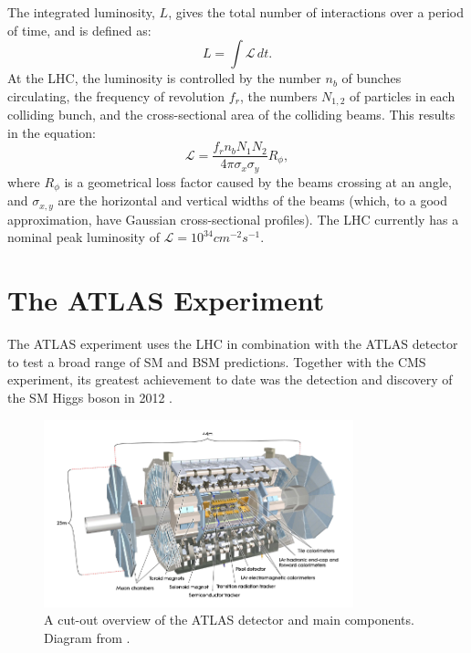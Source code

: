 The integrated luminosity, $L$, gives the total number of interactions over a period of time, and is defined as:
\begin{equation}
L = \int \mathcal{L}\, dt.
\end{equation}
At the LHC, the luminosity is controlled by the number $n_b$ of bunches circulating, the frequency of revolution $f_r$, the numbers $N_{1,2}$ of particles in each colliding bunch, and the cross-sectional area of the colliding beams. This results in the equation:
\begin{equation}
\mathcal{L}  = \frac{ f_rn_bN_1N_2 }{4\pi\sigma_x\sigma_y}R_{\phi},
\end{equation}
where $R_{\phi}$ is a geometrical loss factor caused by the beams crossing at an angle, and $\sigma_{x,y}$ are the horizontal and vertical widths of the beams (which, to a good approximation, have Gaussian cross-sectional profiles). The LHC currently has a nominal peak luminosity of $\mathcal{L} = 10^{34} cm^{-2}s^{-1}$.

\section{The ATLAS Experiment}
\label{section:atlas}

The ATLAS experiment \cite{ATLASDesign} uses the LHC in combination with the ATLAS detector to test a broad range of SM and BSM predictions. Together with the CMS experiment, its greatest achievement to date was the detection and discovery of the SM Higgs boson in 2012 \cite{HiggsDiscovery}.

\begin{figure}[H]
    \centering
    \includegraphics[width=0.8\textwidth]{Figures/2/ATLASDetector.png}
    \caption{A cut-out overview of the ATLAS detector and main components. Diagram from \cite{ATLASDesign}.}
    \label{fig:atlasdec}
\end{figure}

